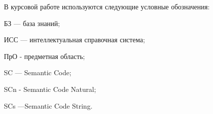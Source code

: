 \label{sec:reduction}
В курсовой работе используются следующие условные обозначения:

БЗ — база знаний;


ИСС — интеллектуальная справочная система;

ПрО - предметная область;

SC — Semantic Code;

SCn - Semantic Code Natural;

SCs —Semantic Code String.
